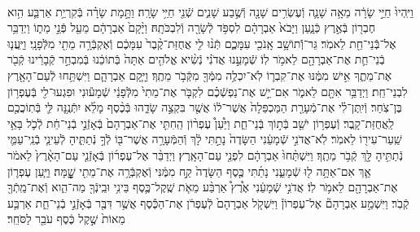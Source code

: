 \documentclass[twoside, openany, parskip=half, 11pt]{book}
\begin{document}
\begin{footnotesize}
\begin{multicols}{2}
\\
וַיִּֽהְיוּ֙ חַיֵּ֣י שָׂרָ֔ה מֵאָ֥ה שָׁנָ֛ה וְֿעֶשְׂרִ֥ים שָׁנָ֖ה וְֿשֶׁ֣בַע שָׁנִ֑ים שְֿׁנֵ֖י חַיֵּ֥י שָׂרָֽה׃ וַתָּ֣מָת שָׂרָ֗ה בְּֿקִרְיַ֥ת אַרְבַּ֛ע הִ֥וא חֶבְר֖וֹן בְּֿאֶ֣רֶץ כְּֿנָ֑עַן וַיָּבֹא֙ אַבְרָהָ֔ם לִסְפֹּ֥ד לְֿשָׂרָ֖ה וְֿלִבְכֹּתָֽהּ׃ וַיָּ֨קָם֙ אַבְרָהָ֔ם מֵעַ֖ל פְּֿנֵ֣י מֵת֑וֹ וַיְדַבֵּ֥ר אֶל־בְּֿֿנֵי־חֵ֖ת לֵאמֹֽר׃ גֵּר־וְֿֿתוֹשָׁ֥ב אָֽנֹכִ֖י עִמָּכֶ֑ם תְּֿנ֨וּ לִ֤י אֲחֻזַּת־קֶ֨בֶר֙ עִמָּכֶ֔ם וְֿאֶקְבְּֿרָ֥ה מֵתִ֖י מִלְּֿפָנָֽי׃ וַיַּֽעֲנ֧וּ בְֿנֵי־חֵ֛ת אֶת־אַבְרָהָ֖ם לֵאמֹ֥ר לֽוֹ׃ שְֿׁמָעֵ֣נוּ אֲדֹנִ֗י נְֿשִׂ֨יא אֱלֹהִ֤ים אַתָּה֙ בְּֿתוֹכֵ֔נוּ בְּֿמִבְחַ֣ר קְֿבָרֵ֔ינוּ קְֿבֹ֖ר אֶת־מֵתֶ֑ךָ אִ֣ישׁ מִמֶּ֔נּוּ אֶת־קִבְר֛וֹ לֹֽא־יִכְלֶ֥ה מִמְּֿךָ֖ מִקְּֿבֹ֥ר מֵתֶֽךָ׃ וַיָּ֧קָם אַבְרָהָ֛ם וַיִּשְׁתַּ֥חוּ לְֿעַם־הָאָ֖רֶץ לִבְנֵי־חֵֽת׃  וַיְדַבֵּ֥ר אִתָּ֖ם לֵאמֹ֑ר אִם־יֵ֣שׁ אֶת־נַפְשְֿׁכֶ֗ם לִקְבֹּ֤ר אֶת־מֵתִי֙ מִלְּֿפָנַ֔י שְֿׁמָע֕וּנִי וּפִגְעוּ־לִ֖י בְּֿעֶפְר֥וֹן בֶּן־צֹֽחַר׃ וְֿיִֽתֶּן־לִ֗י אֶת־מְֿעָרַ֤ת הַמַּכְפֵּלָה֙ אֲשֶׁר־ל֔וֹ אֲשֶׁ֖ר בִּקְצֵ֣ה שָׂדֵ֑הוּ בְּֿכֶ֨סֶף מָלֵ֜א יִתְּֿנֶ֥נָּה לִּ֛י בְּֿתֽוֹכֲכֶ֖ם לַֽאֲחֻזַּת־קָֽבֶר׃ וְֿעֶפְר֥וֹן יֹשֵׁ֖ב בְּֿת֣וֹךְ בְּֿנֵי־חֵ֑ת וַיַּ֩עַן֩ עֶפְר֨וֹן הַֽחִתִּ֤י אֶת־אַבְרָהָם֙ בְּֿאָזְֿנֵ֣י בְֿנֵי־חֵ֔ת לְֿכֹ֛ל בָּאֵ֥י שַֽׁעַר־עִיר֖וֹ לֵאמֹֽר׃ לֹֽא־אֲדֹנִ֣י שְֿׁמָעֵ֔נִי הַשָּׂדֶה֙ נָתַ֣תִּי לָ֔ךְ וְֿהַמְּֿעָרָ֥ה אֲשֶׁר־בּ֖וֹ לְֿךָ֣ נְֿתַתִּ֑יהָ לְֿעֵינֵ֧י בְֿנֵֽי־עַמִּ֛י נְֿתַתִּ֥יהָ לָּ֖ךְ קְֿבֹ֥ר מֵתֶֽךָ׃ וַיִּשְׁתַּ֨חוּ֙ אַבְרָהָ֔ם לִפְנֵ֖י עַם־הָאָֽרֶץ׃  וַיְדַבֵּ֨ר אֶל־עֶפְר֜וֹן בְּֿאָזְֿנֵ֤י עַם־הָאָ֨רֶץ֙ לֵאמֹ֔ר אַ֛ךְ אִם־אַתָּ֥ה ל֖וּ שְֿׁמָעֵ֑נִי נָתַ֜תִּי כֶּ֤סֶף הַשָּׂדֶה֙ קַ֣ח מִמֶּ֔נִּי וְֿאֶקְבְּֿרָ֥ה אֶת־מֵתִ֖י שׇׇׇׇׇׇׇׇָֽׁמָּה׃ וַיַּ֧עַן עֶפְר֛וֹן אֶת־אַבְרָהָ֖ם לֵאמֹ֥ר לֽוֹ׃ אֲדֹנִ֣י שְֿׁמָעֵ֔נִי אֶ֩רֶץ֩ אַרְבַּ֨ע מֵאֹ֧ת שֶֽׁקֶל־כֶּ֛סֶף בֵּינִ֥י וּבֵֽינְֿךָ֖ מַה־הִ֑וא וְֿאֶת־מֵֽתְֿךָ֖ קְֿבֹֽר׃ וַיִּשְׁמַ֣ע אַבְרָהָם֘ אֶל־עֶפְרוֹן֒ וַיִּשְׁקֹ֤ל אַבְרָהָם֙ לְֿעֶפְרֹ֔ן אֶת־הַכֶּ֕סֶף אֲשֶׁ֥ר דִּבֶּ֖ר בְּֿאָזְֿנֵ֣י בְֿנֵי־חֵ֑ת אַרְבַּ֤ע מֵאוֹת֙ שֶׁ֣קֶל כֶּ֔סֶף עֹבֵ֖ר לַסֹּחֵֽר׃


\end{multicols}
\end{footnotesize}
\end{document}
